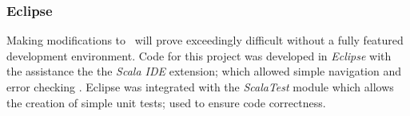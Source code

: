 \subsubsection{Eclipse}
\label{sec:eclipse}

Making modifications to \beagle\ will prove exceedingly difficult without a fully
featured development environment. Code for this project was developed in \emph{Eclipse}
with the assistance the the \emph{Scala IDE} extension; which allowed simple navigation
and error checking \cite{eclipse} \cite{scalaide}. 
Eclipse was integrated with the \emph{ScalaTest} module which allows the creation
of simple unit tests; used to ensure code correctness.
\cite{scalatest}

